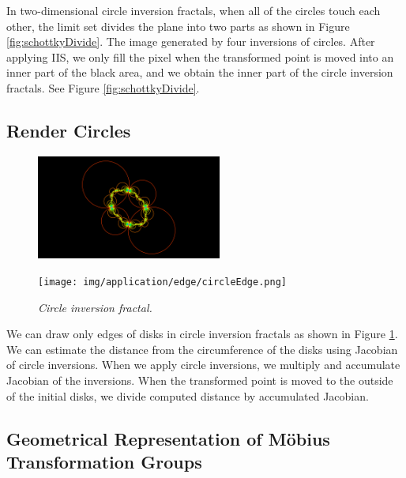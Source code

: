 \noindent In two-dimensional circle inversion fractals,
when all of the circles touch each other, the limit set divides the plane
into two parts as shown in Figure \ref{fig:schottkyDivide}.
The image generated by four inversions of circles.
After applying IIS, we only fill the pixel when the transformed point is
moved into an inner part of the black area, and we obtain the inner part
of the circle inversion fractals. See Figure
 \ref{fig:schottkyDivide}.

\subsection{Render Circles}

\begin{figure}[htbp]
 \begin{minipage}[t]{0.5\hsize}
  \center
  \includegraphics[height=1.35in, keepaspectratio]{img/application/edge/circles.png}
  \subcaption{\textit{}}
  \label{}
  \hspace*{\fill}
 \end{minipage}
 \begin{minipage}[t]{0.5\hsize}
  \center
  \texttt{[image: img/application/edge/circleEdge.png]}
  \subcaption{\textit{}}
  \label{}
  \hspace*{\fill}
 \end{minipage}
 \caption{\textit{Circle inversion fractal.}}
 \label{fig:circleEdge}
\end{figure}

\noindent
We can draw only edges of disks in circle inversion fractals as shown in
Figure \ref{fig:circleEdge}.
We can estimate the distance from the circumference of the disks using Jacobian
of circle inversions.
When we apply circle inversions, we multiply and accumulate Jacobian of
the inversions.
When the transformed point is moved to the outside of the initial disks,
we divide computed distance by accumulated Jacobian.

\subsection{Geometrical Representation of M\"obius Transformation Groups}

